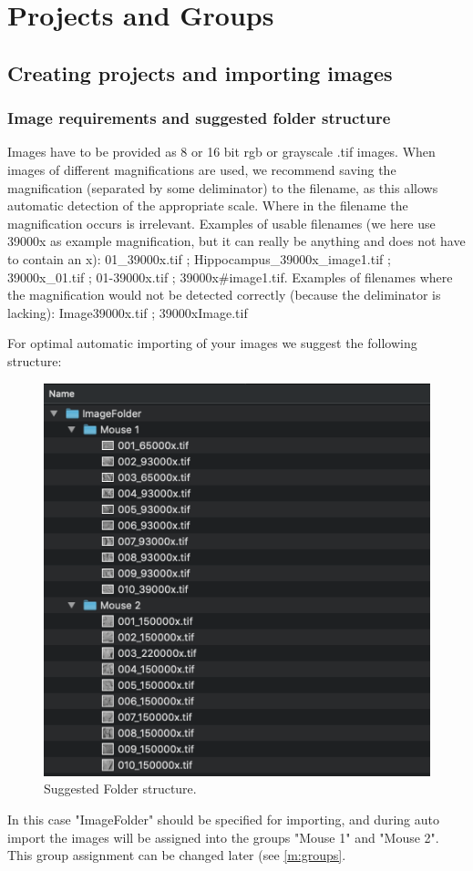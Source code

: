 \documentclass[12pt, a4paper]{scrartcl}
\begin{document}
\section{Projects and Groups}
\subsection{Creating projects and importing images}
\subsubsection{Image requirements and suggested folder structure}
\label{folderstruct}
Images have to be provided as 8 or 16 bit rgb or grayscale .tif images. When images of different magnifications are used, we recommend saving the magnification (separated by some deliminator) to the filename, as this allows automatic detection of the appropriate scale. Where in the filename the magnification occurs is irrelevant. Examples of usable filenames (we here use 39000x as example magnification, but it can really be anything and does not have to contain an x): 01\_39000x.tif ; Hippocampus\_39000x\_image1.tif ; 39000x\_01.tif ; 01-39000x.tif ; 39000x\#image1.tif. Examples of filenames where the magnification would not be detected correctly (because the deliminator is lacking): Image39000x.tif ; 39000xImage.tif

For optimal automatic importing of your images we suggest the following structure:
\begin{figure}[H]
\includegraphics[scale=0.6]{screenshots/scr_folderstructure.png}
\captionsetup{singlelinecheck=off}
\caption[thing]{Suggested Folder structure.}
\end{figure}
In this case "ImageFolder" should be specified for importing, and during auto import the images will be assigned into the groups "Mouse 1" and "Mouse 2". This group assignment can be changed later (see \ref{m:groups}.
\end{document}

